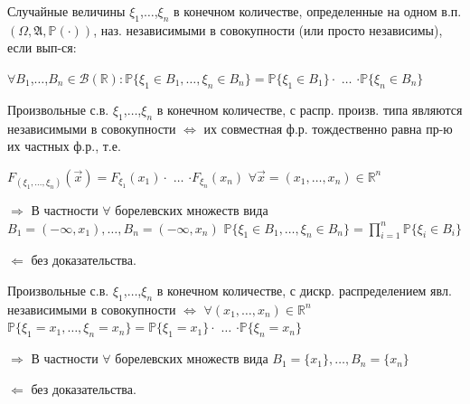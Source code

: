 \begin{defs}
	Случайные величины $\xi_1$,$\dots$,$\xi_n$ в конечном количестве, определенные на одном в.п. $(\Omega,\mathfrak{A},\mathbb{P}(\cdot))$, наз. независимыми
	в совокупности (или просто независимы), если вып-ся:
	
	$\forall B_1$,$\dots$,$B_n \in \mathcal{B}(\mathbb{R}) : \mathbb{P}\{\xi_1 \in B_1,\dots,\xi_n \in B_n\} = \mathbb{P}\{\xi_1 \in B_1\}\cdot$ $\dots$ $\cdot \mathbb{P}\{\xi_n \in B_n\}$
\end{defs}

\begin{proofs}
	Произвольные с.в. $\xi_1$,$\dots$,$\xi_n$ в конечном количестве, с распр. произв. типа являются
	независимыми в совокупности $\iff$ их совместная ф.р. тождественно равна пр-ю их частных ф.р., т.е.
	
	$F_{(\xi_1, \dots , \xi_n)}(\overrightarrow{x}) = F_{\xi_1}(x_1) \cdot$ $\dots$ $\cdot F_{\xi_n}(x_n)$ $\forall \overrightarrow{x} = (x_1,\ldots,x_n) \in \mathbb{R}^n$
	\begin{dokvo}
	
		$\Rightarrow$ В частности $\forall$ борелевских множеств вида $B_1 = (-\infty, x_1), \ldots, B_n = (-\infty, x_n)$ $\mathbb{P}\{\xi_1 \in B_1,\dots,\xi_n \in B_n\} = \prod\limits_{i=1}^{n}\mathbb{P}\{\xi_i \in B_i\}$
		
		$\Leftarrow$ без доказательства.
	\end{dokvo}
\end{proofs}

\begin{proofs}
	Произвольные с.в. $\xi_1$,$\dots$,$\xi_n$ в конечном количестве, с дискр. распределением явл. независимыми в совокупности $\iff$
	$\forall (x_1,\ldots,x_n) \in \mathbb{R}^n$ $\mathbb{P}\{\xi_1 = x_1,\dots,\xi_n = x_n\} = \mathbb{P}\{\xi_1 = x_1\}\cdot$ $\dots$ $\cdot \mathbb{P}\{\xi_n = x_n\}$
	\begin{dokvo}
	
		$\Rightarrow$ В частности $\forall$ борелевских множеств вида $B_1 = \{x_1\}, \ldots, B_n = \{x_n\}$
		
		$\Leftarrow$ без доказательства.
	\end{dokvo}
\end{proofs}


